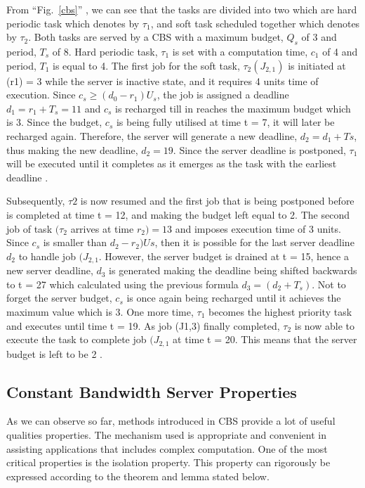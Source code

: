 From ``Fig.~\ref{cbs}'' , we can see that the tasks are divided into two which are hard periodic task which denotes by $\tau_{1}$, and soft task scheduled together which denotes by $\tau_{2}$. Both tasks are served by a CBS with a maximum budget,  $Q_{s}$ of 3 and period, $T_{s}$ of 8. Hard periodic task, $\tau_{1}$ is set with a computation time, $c_1$ of 4 and period,  $T_{1}$ is equal to 4. The first job for the soft task, $\tau_{2} (J_{2,1})$ is initiated at (r1) = 3 while the server is inactive state, and it requires 4 units time of execution. Since $c_{s} \geq (d_{0}-r_{1})U_{s}$, the job is assigned a deadline $d_{1} = r_{1} + T_{s} = 11 $ and $c_{s}$ is recharged till in reaches the maximum budget which is 3. Since the budget, $c_{s}$ is being fully utilised at time t = 7, it will later be recharged again. Therefore, the server will generate a new deadline, $d_{2} = d_{1}+Ts$, thus making the new deadline, $d_{2} = 19$. Since the server deadline is postponed, $\tau_{1}$ will be executed until it completes as it emerges as the task with the earliest deadline \cite{b2}.

Subsequently, $\tau{2}$ is now resumed and the first job that is being postponed before is completed at time t = 12, and making the budget left equal to 2. The second job of task $(\tau_{2}$ arrives at time $r_{2}) = 13$ and imposes execution time of 3 units. Since $c_{s}$ is smaller than $d_{2} − r_{2})Us$, then it is possible for the last server deadline $d_{2}$ to handle job $(J_{2,1}$. However, the server budget is drained at t = 15, hence a new server deadline, $d_{3}$ is generated making the deadline being shifted backwards to t = 27 which calculated using the previous formula $d_{3} = (d_{2}+T_{s})$. Not to forget the server budget, $c_{s}$ is once again being recharged until it achieves the maximum value which is 3. One more time, $\tau_{1}$ becomes the highest priority task and executes until time t = 19. As job (J1,3) finally completed, $\tau_{2}$ is now able to execute the task to complete job $(J_{2,1}$ at time t = 20. This means that the server budget is left to be 2 \cite{b2}.

\subsection{Constant Bandwidth Server Properties}

As we can observe so far, methods introduced in CBS provide a lot of useful qualities properties. The mechanism used is appropriate and convenient in assisting applications that includes complex computation. One of the most critical properties is the isolation property. This property can rigorously be expressed according to the theorem and lemma stated below. 

